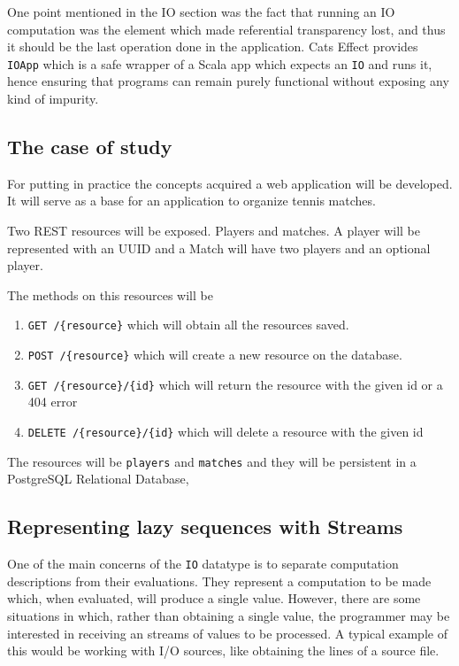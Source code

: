 \documentclass[../main.tex]{subfiles}
\begin{document}
One point mentioned in the IO section was the fact that running an IO computation was the
element which made referential transparency lost, and thus it should be the last
operation done in the application. Cats Effect provides \texttt{IOApp} which is
a safe wrapper of a Scala app which expects an \texttt{IO} and runs it, hence ensuring
that programs can remain purely functional without exposing any kind of impurity.

\subsection{The case of study}
For putting in practice the concepts acquired a web application will be
developed. It will serve as a base for an application to organize tennis
matches.

Two REST resources will be exposed. Players and matches. A player will be
represented with an UUID and a Match will have two players and an optional
player.

The methods on this resources will be
\begin{enumerate}
\item \texttt{GET /\{resource\}} which will obtain all the resources saved.
\item \texttt{POST /\{resource\}} which will create a new resource on the
  database.
\item \texttt{GET /\{resource\}/\{id\}} which will return the resource with the
  given id or a 404 error
\item \texttt{DELETE /\{resource\}/\{id\}} which will delete a resource with the
  given id
\end{enumerate}

The resources will be \texttt{players} and \texttt{matches} and they will be
persistent in a PostgreSQL Relational Database,

\subsection{Representing lazy sequences with Streams}
One of the main concerns of the \texttt{IO} datatype is to separate computation
descriptions from their evaluations. They represent a computation to be
made which, when evaluated, will produce a single value. However, there are some
situations in which, rather than obtaining a single value, the programmer may be
interested in receiving an streams of values to be processed. A typical example
of this would be working with I/O sources, like obtaining the lines of a source
file.
\end{document}
